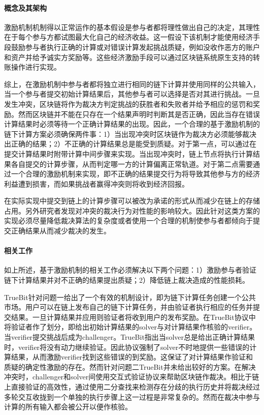 \paragraph{概念及其架构}
激励机制机制得以正常运作的基本假设是参与者都将理性做出自己的决定，其理性在于每个参与方都试图最大化自己的经济收益。这一假设下该机制才能使用经济手段鼓励参与者执行正确的计算或对错误计算发起挑战质疑，例如没收作恶方的账户和资产并给予诚实方奖励等。这些经济激励手段可以通过区块链系统原生支持的转账操作进行实现。

综上，在激励机制中参与者都将独立进行相同的链下计算并使用同样的公共输入，当一个参与者提交初始计算结果后，其他参与者可以选择是否对其进行挑战。一旦发生冲突，区块链将作为裁决方判定挑战的获胜者和失败者并给予相应的惩罚和奖励。然而区块链并不能在只存在一个结果声明时判断其是否正确，因此当存在错误计算结果时必须等待一个正确计算结果的出现。因此，一个合理的基于激励机制的链下计算方案必须确保两件事：1）当出现冲突时区块链作为裁决方必须能够裁决出正确的结果；2）不正确的计算结果总是能受到质疑。对于第一点，可以通过在提交计算结果时附带计算中间步骤来实现。当出现冲突时，链上节点将执行计算结果各自提交的计算步骤，从而判定哪一方的计算偏离正常轨道。对于第二点需要通过一个合理的激励机制来实现，即不正确的结果提交行为将导致其他参与方的经济利益遭到损害，而如果挑战者赢得冲突则将收到经济回报。

在实际实现中提交到链上的计算步骤可以被改为承诺的形式从而减少在链上的存储占用。另外研究者发现对冲突的裁决行为对性能的影响较大。因此针对这类方案的实现必须尽量降低裁决算法的复杂度或者使用一个合理的机制使参与者都倾向于提交正确结果从而减少裁决的发生。

\paragraph{相关工作}
如上所述，基于激励机制的相关工作必须解决以下两个问题：1）激励参与者验证链下计算结果并对不正确的结果提出质疑；2）降低链上裁决造成的性能损耗。

TrueBit\cite{2019arXiv190804756T}针对问题一给出了一个有效的机制设计，即为链下计算任务创建一个公共市场。用户可以在链上发布自己的链下计算任务，并由验证者执行相应的任务并提交结果。一旦计算结果并应用则验证者将收到用户的发布奖励。在TrueBit协议中将验证者作了划分，即给出初始计算结果的solver与对计算结果作核验的verifier。当verifier提交挑战后成为challenger。TrueBit指出当solver总是给出正确计算结果时，verifier将没有动力继续验证。因此协议强制了solver不时地提供一些错误的计算结果，从而激励verifier找到这些错误的到奖励。这保证了对计算结果作验证和质疑的确定性激励的存在。然而针对问题二TrueBit并未给出较好的方案。在解决冲突时，challenger和solver间使用交互式验证协议\cite{2016arXiv160605917J, Christian}来帮助区块链作裁决。相比于链上直接验证的高效性，通过使用二分查找来检测存在分歧的执行历史并将裁决经过多轮交互收拢到一个单独的执行步骤上这一过程是非常复杂的。然而在裁决中参与计算的所有输入都会被公开以便作核验。

